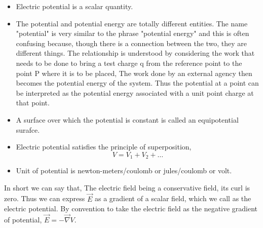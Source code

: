 \begin{itemize}
	\item Electric potential is a scalar quantity.
	\item The potential and potential energy are totally different entities. The name "potential" is very similar to the phrase "potential energy" and this is often confusing because, though there is a connection between the two, they are different things. The relationship is understood by considering the work that needs to be done to bring a test charge q from the reference point to the point $\mathrm{P}$ where it is to be placed, The work done by an external agency then becomes the potential energy of the system. Thus the potential at a point can be interpreted as the potential energy associated with a unit point charge at that point.
	
	\item A surface over which the potential is constant is called
	an equipotential surafce.
	\item Electric potential satisfies the principle of superposition, $$V=V_{1}+V_{2}+\ldots$$
	\item Unit of potential is newton-meters/coulomb or jules/coulomb or volt.
\end{itemize}
In short we can say that, The electric field being a conservative field, its curl is zero. Thus we can  express $\vec{E}$ as a gradient of a scalar field, which we call as the electric potential. By convention to take the electric field as the negative gradient of potential, $\vec{E}=-\vec{\nabla} V$. 

